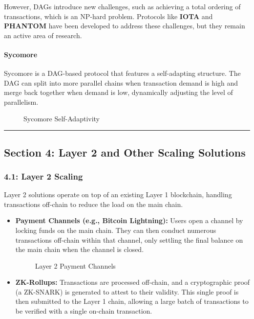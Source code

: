 However, DAGs introduce new challenges, such as achieving a total
ordering of transactions, which is an NP-hard problem. Protocols like
\textbf{IOTA} and \textbf{PHANTOM} have been developed to address these
challenges, but they remain an active area of research.

\paragraph{Sycomore}\label{sycomore}

Sycomore is a DAG-based protocol that features a self-adapting
structure. The DAG can split into more parallel chains when transaction
demand is high and merge back together when demand is low, dynamically
adjusting the level of parallelism.

\begin{figure}
\centering
\caption{Sycomore Self-Adaptivity}
\end{figure}

\begin{center}\rule{0.5\linewidth}{0.5pt}\end{center}

\subsection{Section 4: Layer 2 and Other Scaling
Solutions}\label{section-4-layer-2-and-other-scaling-solutions}

\subsubsection{4.1: Layer 2 Scaling}\label{layer-2-scaling}

Layer 2 solutions operate on top of an existing Layer 1 blockchain,
handling transactions off-chain to reduce the load on the main chain.

\begin{itemize}
\item
  \textbf{Payment Channels (e.g., Bitcoin Lightning):} Users open a
  channel by locking funds on the main chain. They can then conduct
  numerous transactions off-chain within that channel, only settling the
  final balance on the main chain when the channel is closed.

  \begin{figure}
  \centering
  \caption{Layer 2 Payment Channels}
  \end{figure}
\item
  \textbf{ZK-Rollups:} Transactions are processed off-chain, and a
  cryptographic proof (a ZK-SNARK) is generated to attest to their
  validity. This single proof is then submitted to the Layer 1 chain,
  allowing a large batch of transactions to be verified with a single
  on-chain transaction.
\end{itemize}

